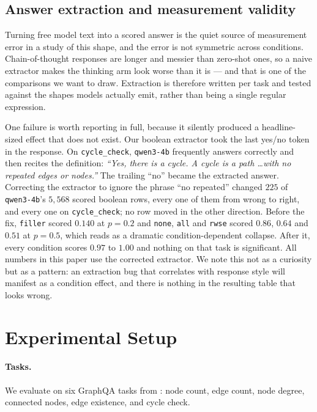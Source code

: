 \documentclass[11pt]{article}
\begin{document}
\subsection{Answer extraction and measurement validity}
\label{sec:extraction}

Turning free model text into a scored answer is the quiet source of
measurement error in a study of this shape, and the error is not symmetric
across conditions. Chain-of-thought responses are longer and messier than
zero-shot ones, so a naive extractor makes the thinking arm look worse than
it is --- and that is one of the comparisons we want to draw. Extraction is
therefore written per task and tested against the shapes models actually
emit, rather than being a single regular expression.

One failure is worth reporting in full, because it silently produced a
headline-sized effect that does not exist. Our boolean extractor took the
last yes/no token in the response. On \texttt{cycle\_check},
\texttt{qwen3-4b} frequently answers correctly and then recites the
definition: \emph{``Yes, there is a cycle. A cycle is a path \dots with no
repeated edges or nodes.''} The trailing ``no'' became the extracted
answer. Correcting the extractor to ignore the phrase ``no repeated''
changed $225$ of \texttt{qwen3-4b}'s $5{,}568$ scored boolean rows, every
one of them from wrong to right, and every one on \texttt{cycle\_check};
no row moved in the other direction. Before the fix, \texttt{filler} scored
$0.140$ at $p{=}0.2$ and \texttt{none}, \texttt{all} and \texttt{rwse}
scored $0.86$, $0.64$ and $0.51$ at $p{=}0.5$, which reads as a dramatic
condition-dependent collapse. After it, every condition scores $0.97$ to
$1.00$ and nothing on that task is significant. All numbers in this paper
use the corrected extractor. We note this not as a curiosity but as a
pattern: an extraction bug that correlates with response style will
manifest as a condition effect, and there is nothing in the resulting
table that looks wrong.

\section{Experimental Setup}
\label{sec:setup}

\paragraph{Tasks.} We evaluate on six GraphQA tasks from
\citet{fatemi2023talklikeagraph}: node count, edge count, node degree,
connected nodes, edge existence, and cycle check.
\end{document}
